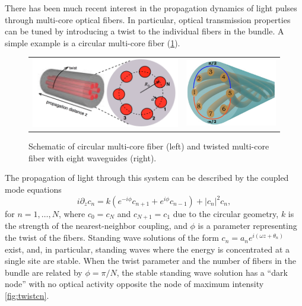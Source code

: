\documentclass[12pt,reqno,oneside]{article}
\theoremstyle{definition}
\theoremstyle{remark}
\begin{document}
There has been much recent interest in the propagation dynamics of light pulses through multi-core optical fibers. In particular, optical transmission properties can be tuned by introducing a twist to the individual fibers in the bundle. A simple example is a circular multi-core fiber \cite{Longhi2016,CastroCastro2016,Parto2017} (\cref{fig:twist}).
\begin{figure}[H]
\begin{center}
\begin{tabular}{cc}
\includegraphics[width=6.5cm]{images/twist2.png} &
\includegraphics[width=4cm]{images/twistmulticore.png}
\end{tabular}
\end{center}
\caption{Schematic of circular multi-core fiber \cite{Longhi2016} (left) and twisted multi-core fiber with eight waveguides \cite{Parto2017} (right).}
\label{fig:twist}
\end{figure}
The propagation of light through this system can be described by the coupled mode equations
\begin{equation*}
i \partial_z c_n = k \left(e^{-i\phi}c_{n+1} + e^{i\phi}c_{n-1}\right) + |c_n|^2 c_n,
\end{equation*}
for $n = 1, \dots, N$, where $c_0 = c_{N}$ and $c_{N+1} = c_1$ due to the circular geometry, $k$ is the strength of the nearest-neighbor coupling, and $\phi$ is a parameter representing the twist of the fibers. Standing wave solutions of the form $c_n = a_n e^{i (\omega z + \theta_n) }$ exist, and, in particular, standing waves where the energy is concentrated at a single site are stable. When the twist parameter and the number of fibers in the bundle are related by $\phi = \pi/N$, the stable standing wave solution has a ``dark node'' with no optical activity opposite the node of maximum intensity \cref{fig:twistcn}. 
\end{document}

